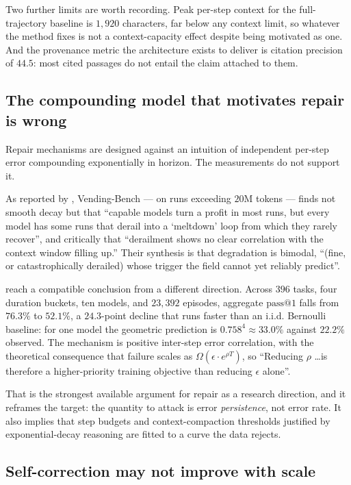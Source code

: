 \documentclass[10pt,twocolumn,a4paper]{article}
\begin{document}
Two further limits are worth recording.
Peak per-step context for the full-trajectory baseline is $1{,}920$ characters, far below
any context limit, so whatever the method fixes is not a context-capacity effect despite
being motivated as one.
And the provenance metric the architecture exists to deliver is citation precision of
$44.5$: most cited passages do not entail the claim attached to them.

\subsection{The compounding model that motivates repair is wrong}

Repair mechanisms are designed against an intuition of independent per-step error
compounding exponentially in horizon.
The measurements do not support it.

As reported by \citet{chen2026horizongapplanningmemory}, Vending-Bench --- on runs
exceeding $20$M tokens --- finds not smooth decay but that ``capable models turn a profit
in most runs, but every model has some runs that derail into a `meltdown' loop from which
they rarely recover'', and critically that ``derailment shows no clear correlation with the
context window filling up.''
Their synthesis is that degradation is bimodal, ``(fine, or catastrophically derailed)
whose trigger the field cannot yet reliably predict''.

\citet{khanal2026pass1reliabilityscienceframework} reach a compatible conclusion from a
different direction.
Across $396$ tasks, four duration buckets, ten models, and $23{,}392$ episodes, aggregate
$\mathrm{pass}@1$ falls from $76.3\%$ to $52.1\%$, a $24.3$-point decline that runs faster
than an i.i.d. Bernoulli baseline: for one model the geometric prediction is
$0.758^4 \approx 33.0\%$ against $22.2\%$ observed.
The mechanism is positive inter-step error correlation, with the theoretical consequence
that failure scales as $\Omega(\epsilon \cdot e^{\rho T})$, so ``Reducing $\rho$ \ldots is
therefore a higher-priority training objective than reducing $\epsilon$ alone''.

That is the strongest available argument for repair as a research direction, and it
reframes the target: the quantity to attack is error \emph{persistence}, not error rate.
It also implies that step budgets and context-compaction thresholds justified by
exponential-decay reasoning are fitted to a curve the data rejects.

\subsection{Self-correction may not improve with scale}
\end{document}
